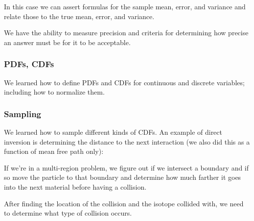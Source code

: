 \documentclass[12pt]{article}
\begin{document}
In this case we can assert formulas for the sample mean, error, and variance and relate those to the true mean, error, and variance. 

We have the ability to measure precision and criteria for determining how precise an answer must be for it to be acceptable. 


\subsubsection*{PDFs, CDFs}
We learned how to define PDFs and CDFs for continuous and discrete variables; including how to normalize them. 

\subsubsection*{Sampling}
We learned how to sample different kinds of CDFs. An example of direct inversion is determining the distance to the next interaction (we also did this as a function of mean free path only):

%
%
%
%
If we're in a multi-region problem, we figure out if we intersect a boundary and if so move the particle to that boundary and determine how much farther it goes into the next material before having a collision.

After finding the location of the collision and the isotope collided with, we need to determine what type of collision occurs. 

%
%
%
\end{document}
